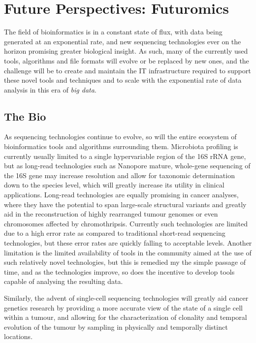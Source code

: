 \section{Future Perspectives: Futuromics}

The field of bioinformatics is in a constant state of flux, with data being generated at an exponential rate, and new sequencing technologies ever on the horizon promising greater biological insight. As such, many of the currently used tools, algorithms and file formats will evolve or be replaced by new ones, and the challenge will be to create and maintain the IT infrastructure required to support these novel tools and techniques and to scale with the exponential rate of data analysis in this era of \emph{big data}.

\subsection{The Bio}
As sequencing technologies continue to evolve, so will the entire ecosystem of bioinformatics tools and algorithms surrounding them. Microbiota profiling is currently usually limited to a single hypervariable region of the 16S rRNA gene, but as long-read technologies such as Nanopore mature, whole-gene sequencing of the 16S gene may increase resolution and allow for taxonomic determination down to the species level, which will greatly increase its utility in clinical applications. Long-read technologies are equally promising in cancer analyses, where they have the potential to span large-scale structural variants and greatly aid in the reconstruction of highly rearranged tumour genomes or even chromosomes affected by chromothripsis. Currently such technologies are limited due to a high error rate as compared to traditional short-read sequencing technologies, but these error rates are quickly falling to acceptable levels. Another limitation is the limited availability of tools in the community aimed at the use of such relatively novel technologies, but this is remedied my the simple passage of time, and as the technologies improve, so does the incentive to develop tools capable of analysing the resulting data.

Similarly, the advent of single-cell sequencing technologies will greatly aid cancer genetics research by providing a more accurate view of the state of a single cell within a tumour, and allowing for the characterization of clonality and temporal evolution of the tumour by sampling in physically and temporally distinct locations.


